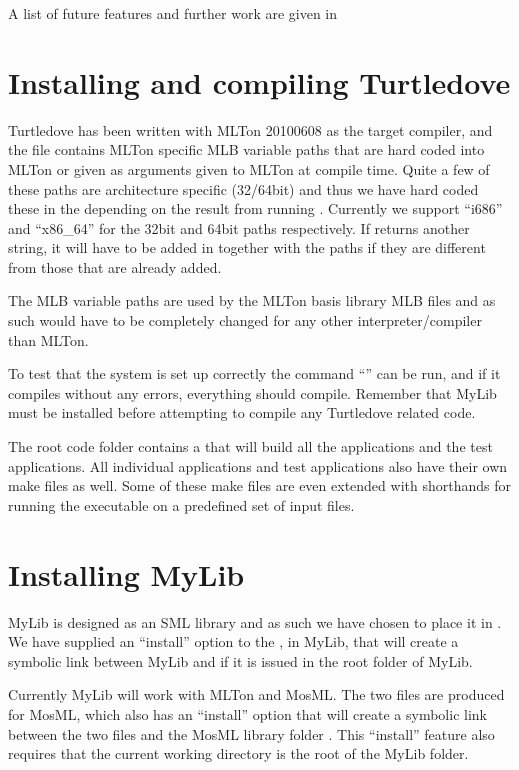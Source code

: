 A list of future features and further work are given in 


\section{Installing and compiling Turtledove}
Turtledove has been written with MLTon 20100608 as the target compiler, and the
 file contains MLTon specific MLB variable paths that
are hard coded into MLTon or given as arguments given to MLTon at compile
time. Quite a few of these paths are architecture specific (32/64bit) and thus
we have hard coded these in the  depending on the result from
running . Currently we support ``i686'' and ``x86_64'' for the
32bit and 64bit paths respectively. If  returns another string, it
will have to be added in  together with the paths if they are
different from those that are already added.  

The MLB variable paths are used by the MLTon basis library MLB files and as such
would have to be completely changed for any other interpreter/compiler than
MLTon.

To test that the system is set up correctly the command ``'' can be run, and if it compiles without any errors,
everything should compile. Remember that MyLib must be installed before
attempting to compile any Turtledove related code.

The root code folder contains a  that will build all the
applications and the test applications. All individual applications and test
applications also have their own make files as well. Some of these make files
are even extended with shorthands for running the executable on a predefined set
of input files.

\section{Installing MyLib}
MyLib is designed as an SML library and as such we have chosen to place it in
. We have supplied an ``install'' option to the
, in MyLib, that will create a symbolic link between MyLib and
 if it is issued in the root folder of MyLib.

Currently MyLib will work with MLTon and MosML. The two  files
are produced for MosML, which also has an ``install'' option that will create a
symbolic link between the two files and the MosML library folder
. This ``install'' feature also requires that the current
working directory is the root of the MyLib folder.

